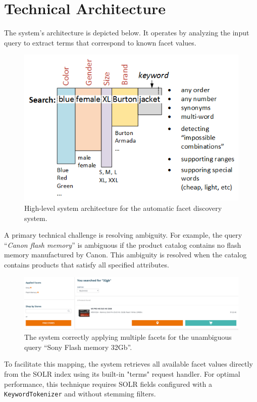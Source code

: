 \documentclass{article}
\begin{document}
    \section{Technical Architecture}

    The system's architecture is depicted below. It operates by analyzing the input query to extract terms that correspond to known facet values.

    \begin{figure}[H]
        \centering
        \includegraphics[width=0.6\columnwidth]{searchimproved30.png}
        \caption{High-level system architecture for the automatic facet discovery system.}
        \label{fig:architecture}
    \end{figure}

    A primary technical challenge is resolving ambiguity. For example, the query “\textit{Canon flash memory}” is ambiguous if the product catalog contains no flash memory manufactured by Canon. This ambiguity is resolved when the catalog contains products that satisfy all specified attributes.

    \begin{figure}[H]
        \centering
        \includegraphics[width=\columnwidth]{2017-06-25_22h24_20-1.png}
        \caption{The system correctly applying multiple facets for the unambiguous query “Sony Flash memory 32Gb”.}
        \label{fig:unambiguous_query}
    \end{figure}

    To facilitate this mapping, the system retrieves all available facet values directly from the SOLR index using its built-in "terms" request handler. For optimal performance, this technique requires SOLR fields configured with a \texttt{KeywordTokenizer} and without stemming filters.
\end{document}
